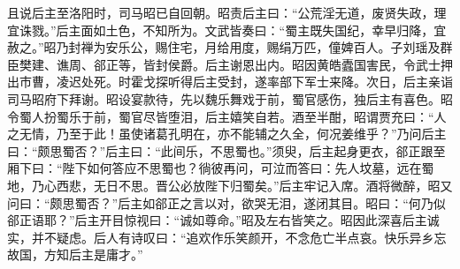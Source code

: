 且说后主至洛阳时，司马昭已自回朝。昭责后主曰：“公荒淫无道，废贤失政，理宜诛戮。”后主面如土色，不知所为。文武皆奏曰：“蜀主既失国纪，幸早归降，宜赦之。”昭乃封禅为安乐公，赐住宅，月给用度，赐绢万匹，僮婢百人。子刘瑶及群臣樊建、谯周、郤正等，皆封侯爵。后主谢恩出内。昭因黄皓蠹国害民，令武士押出市曹，凌迟处死。时霍戈探听得后主受封，遂率部下军士来降。次日，后主亲诣司马昭府下拜谢。昭设宴款待，先以魏乐舞戏于前，蜀官感伤，独后主有喜色。昭令蜀人扮蜀乐于前，蜀官尽皆堕泪，后主嬉笑自若。酒至半酣，昭谓贾充曰：“人之无情，乃至于此！虽使诸葛孔明在，亦不能辅之久全，何况姜维乎？”乃问后主曰：“颇思蜀否？”后主曰：“此间乐，不思蜀也。”须臾，后主起身更衣，郤正跟至厢下曰：“陛下如何答应不思蜀也？徜彼再问，可泣而答曰：先人坟墓，远在蜀地，乃心西悲，无日不思。晋公必放陛下归蜀矣。”后主牢记入席。酒将微醉，昭又问曰：“颇思蜀否？”后主如郤正之言以对，欲哭无泪，遂闭其目。昭曰：“何乃似郤正语耶？”后主开目惊视曰：“诚如尊命。”昭及左右皆笑之。昭因此深喜后主诚实，并不疑虑。后人有诗叹曰：“追欢作乐笑颜开，不念危亡半点哀。快乐异乡忘故国，方知后主是庸才。”

